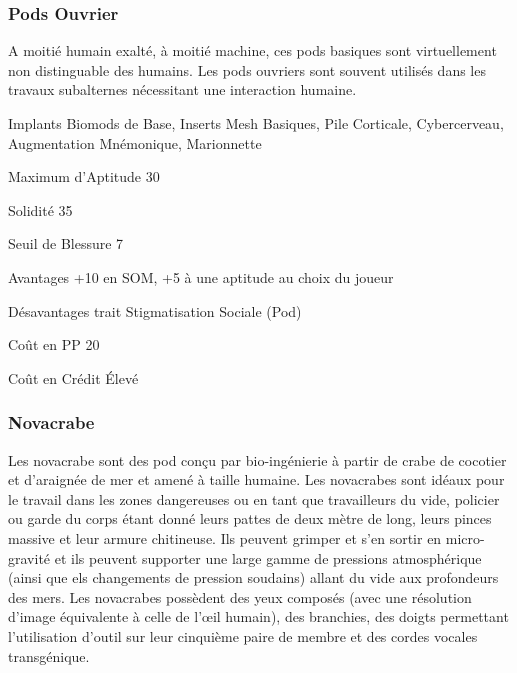 \subsubsection{Pods Ouvrier} \label{sec:starting-worker-pods} 

A moitié humain exalté, à moitié machine, ces pods basiques sont virtuellement non distinguable des humains. Les pods ouvriers sont souvent utilisés dans les travaux subalternes nécessitant une interaction humaine. 

\begin{description*} \item[Implants] Biomods de Base, Inserts Mesh Basiques, Pile Corticale, Cybercerveau, Augmentation Mnémonique, Marionnette\item[Maximum d'Aptitude] 30 \item[Solidité] 35 \item[Seuil de Blessure] 7 \item[Avantages] +10 en SOM, +5 à une aptitude au choix du joueur\item[Désavantages] trait Stigmatisation Sociale (Pod) \item [Coût en PP] 20 \item[Coût en Crédit] Élevé \end{description*} 

\subsubsection{Novacrabe} \label{sec:starting-novacrab} 

Les novacrabe sont des pod conçu par bio-ingénierie à partir de crabe de cocotier et d'araignée de mer et amené à taille humaine. Les novacrabes sont idéaux pour le travail dans les zones dangereuses ou en tant que travailleurs du vide, policier ou garde du corps étant donné leurs pattes de deux mètre de long, leurs pinces massive et leur armure chitineuse. Ils peuvent grimper et s'en sortir en micro-gravité et ils peuvent supporter une large gamme de pressions atmosphérique (ainsi que els changements de pression soudains) allant du vide aux profondeurs des mers. Les novacrabes possèdent des yeux composés (avec une résolution d'image équivalente à celle de l'œil humain), des branchies, des doigts permettant l'utilisation d'outil sur leur cinquième paire de membre et des cordes vocales transgénique. 

